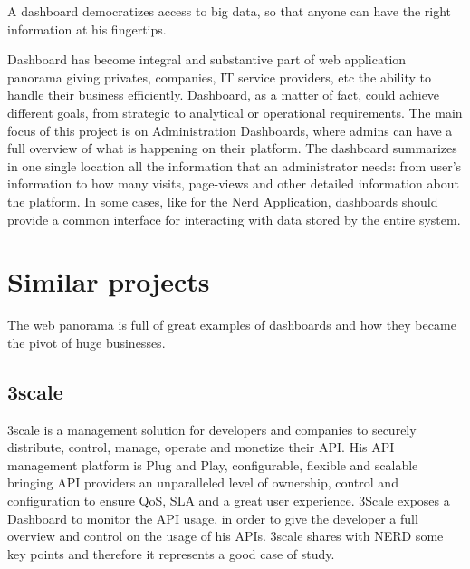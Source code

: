 \documentclass[a4paper,13pt]{report}
\begin{document}
A dashboard democratizes access to big data, so that anyone  can have the right information at his fingertips.

Dashboard has become integral and substantive part of web application panorama giving privates, companies, IT service providers, etc the ability to handle their business efficiently. Dashboard, as a matter of fact, could achieve different goals, from strategic to analytical or operational requirements.\newline
The main focus of this project is on Administration Dashboards, where admins can have a full overview of what is happening on their platform. The dashboard summarizes in one single location all the information that an administrator needs: from user's information to how many visits, page-views and other detailed information about the platform. In some cases, like for the Nerd Application, dashboards should provide a common interface for interacting with data stored by the entire system.

\chapter{Similar projects}

The web panorama is full of great examples of dashboards and how they became the pivot of huge businesses.
\section{3scale}
3scale is a management solution for developers and companies to securely distribute, control, manage, operate and monetize their API. His API management platform is Plug and Play, configurable, flexible and scalable bringing API providers an unparalleled level of ownership, control and configuration to ensure QoS, SLA and a great user experience.
3Scale exposes a Dashboard to monitor the API usage, in order to give the developer a full overview and control on the usage of his APIs.
3scale shares with NERD some key points and therefore it  represents a good case of study.
\end{document}
